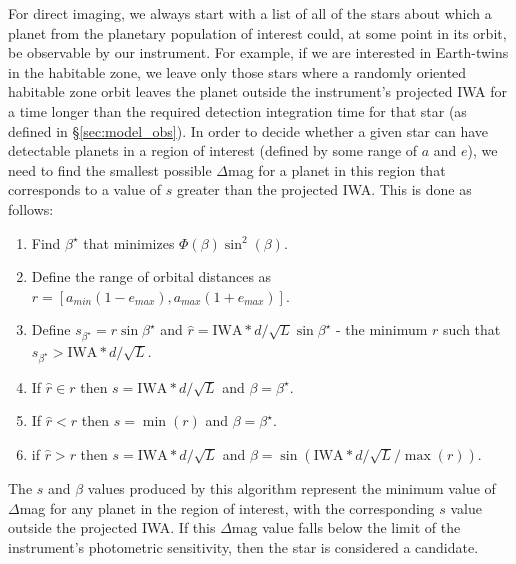 For direct imaging, we always start with a list of all of the stars about which a planet from the planetary population of interest  could, at some point in its orbit, be observable by our instrument.  For example, if we are interested in Earth-twins in the habitable zone, we leave only those stars where a randomly oriented habitable zone orbit leaves the planet outside the instrument's projected IWA for a time longer than the required detection integration time for that star (as defined in \S\ref{sec:model_obs}).  In order to decide whether a given star can have detectable planets in a region of interest (defined by some range of $a$ and $e$), we need to find the smallest possible $\Delta$mag for a planet in this region that corresponds to a value of $s$ greater than the projected IWA.  This is done as follows:
\begin{enumerate}
\item Find $\beta^\star$ that minimizes $\Phi(\beta)\sin^2(\beta)$.
\item Define the range of orbital distances as $r = [a_{min}(1-e_{max}),a_{max}(1+e_{max})]$.
\item Define $s_{\beta^\star} = r\sin\beta^\star$ and $\hat{r} = \textrm{IWA}*d/\sqrt{L} \sin\beta^\star$ - the minimum $r$ such that $s_{\beta^\star} >  \textrm{IWA}*d/\sqrt{L} $.
\item If $\hat{r} \in r$ then $s =  \textrm{IWA}*d/\sqrt{L}$ and $\beta = \beta^\star$.
\item If $\hat{r} < r$ then $s = \min(r)$ and $\beta = \beta^\star$.
\item if $\hat{r} > r$ then $s =  \textrm{IWA}*d/\sqrt{L}$ and $\beta = \sin(\textrm{IWA}*d/\sqrt{L}/\max(r))$.
\end{enumerate}
The $s$ and $\beta$ values produced by this algorithm represent the minimum value of $\Delta$mag for any planet in the region of interest, with the corresponding $s$ value outside the projected IWA.  If this $\Delta$mag value falls below the limit of the instrument's photometric sensitivity, then the star is considered a candidate. 

